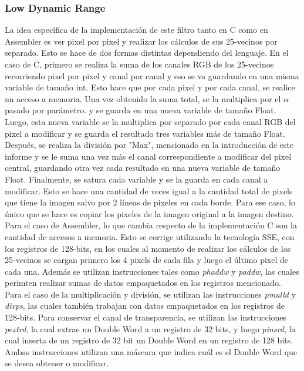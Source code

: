\documentclass[a4paper]{article}
\begin{document}
\subsubsection{Low Dynamic Range}
La idea específica de la implementación de este filtro tanto en C como en Assembler es ver pixel por pixel y realizar los cálculos
de sus 25-vecinos por separado. Esto se hace de dos formas distintas dependiendo del lenguaje.
\newline
En el caso de C, primero se realiza la suma de los canales RGB de los 25-vecinos recorriendo pixel por pixel y canal por canal y
eso se va guardando en una misma variable de tamaño int.
Esto hace que por cada pixel y por cada canal, se realice un acceso a memoria. \newline
Una vez obtenido la suma total, se la multiplica por el $\alpha$ pasado por parámetro. y se guarda en una nueva variable de tamaño Float.
Luego, esta nueva variable se la multiplica por separado por cada canal RGB del pixel a modificar y se guarda el resultado tres variables más
de tamaño Float. Después, se realiza la división por "Max", mencionado en la introducción de este informe y se le suma una vez más el canal
correspondiente a modificar del pixel central, guardando otra vez cada resultado en una nueva variable de tamaño Float. Finalmente,
se satura cada variable y se la guarda en cada canal a modificar. Esto se hace una cantidad de veces igual a la cantidad total de pixels
que tiene la imagen salvo por 2 líneas de pixeles en cada borde. Para ese caso, lo único que se hace es copiar los pixeles de la imagen original
a la imagen destino. \newline
Para el caso de Assembler, lo que cambia respecto de la implementación C son la cantidad de accesos a memoria. Esto se corrige utilizando la
tecnología SSE, con los registros de 128-bits, en los cuales al momento de realizar los cálculos de los 25-vecinos se cargan primero los 4 pixels
de cada fila y luego el último pixel de cada una. Además se utilizan instrucciones tales como \textit{phaddw} y \textit{paddw}, las cuales
perimten realizar sumas de datos empaquetados en los registros mencionado. Para el caso de la multiplicación y división, se utilizan las instrucciones
\textit{pmulld} y \textit{divps}, las cuales también trabajan con datos empaquetados en los registros de 128-bits. Para conservar el canal de
transparencia, se utilizan las instrucciones \textit{pextrd}, la cual extrae un Double Word a un registro de 32 bits, y luego \textit{pinsrd},
la cual inserta de un registro de 32 bit un Double Word en un registro de 128 bits. Ambas instrucciones utilizan una máscara que indica cuál
es el Double Word que se desea obtener o modificar.
\newline
\end{document}
